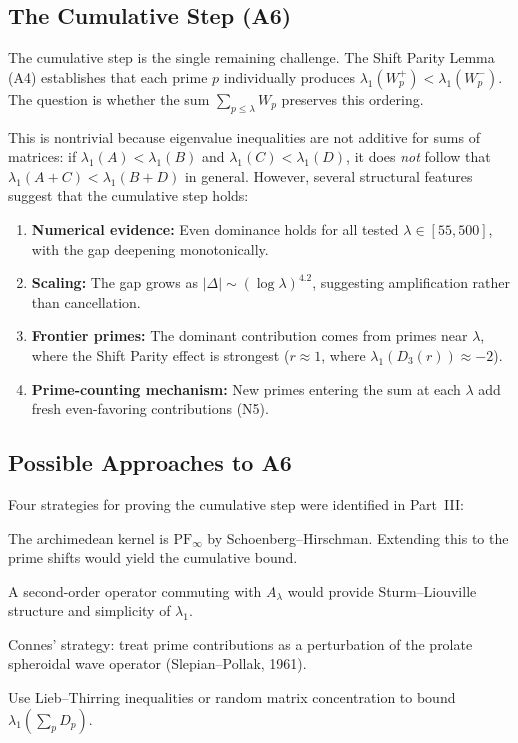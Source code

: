 \documentclass[12pt,a4paper]{article}
\theoremstyle{definition}
\theoremstyle{remark}
\begin{document}
\subsection{The Cumulative Step (A6)}

The cumulative step is the single remaining challenge. The Shift Parity Lemma (A4) establishes that each prime $p$ individually produces $\lambda_1(W_p^+) < \lambda_1(W_p^-)$. The question is whether the sum $\sum_{p \leq \lambda} W_p$ preserves this ordering.

This is nontrivial because eigenvalue inequalities are not additive for sums of matrices: if $\lambda_1(A) < \lambda_1(B)$ and $\lambda_1(C) < \lambda_1(D)$, it does \emph{not} follow that $\lambda_1(A+C) < \lambda_1(B+D)$ in general. However, several structural features suggest that the cumulative step holds:

\begin{enumerate}
  \item \textbf{Numerical evidence:} Even dominance holds for all tested $\lambda \in [55, 500]$, with the gap deepening monotonically.
  \item \textbf{Scaling:} The gap grows as $|\Delta| \sim (\log\lambda)^{4.2}$, suggesting amplification rather than cancellation.
  \item \textbf{Frontier primes:} The dominant contribution comes from primes near $\lambda$, where the Shift Parity effect is strongest ($r \approx 1$, where $\lambda_1(D_3(r)) \approx -2$).
  \item \textbf{Prime-counting mechanism:} New primes entering the sum at each $\lambda$ add fresh even-favoring contributions (N5).
\end{enumerate}

\subsection{Possible Approaches to A6}

Four strategies for proving the cumulative step were identified in Part~III:

\begin{description}[font=\bfseries,leftmargin=1em]
  \item[(A) Total positivity.] The archimedean kernel is $\mathrm{PF}_\infty$ by Schoenberg--Hirschman. Extending this to the prime shifts would yield the cumulative bound.
  \item[(B) Commuting differential operator.] A second-order operator commuting with $A_\lambda$ would provide Sturm--Liouville structure and simplicity of $\lambda_1$.
  \item[(C) Prolate perturbation.] Connes' strategy: treat prime contributions as a perturbation of the prolate spheroidal wave operator (Slepian--Pollak, 1961).
  \item[(D) Trace-moment methods.] Use Lieb--Thirring inequalities or random matrix concentration to bound $\lambda_1(\sum_p D_p)$.
\end{description}
\end{document}
